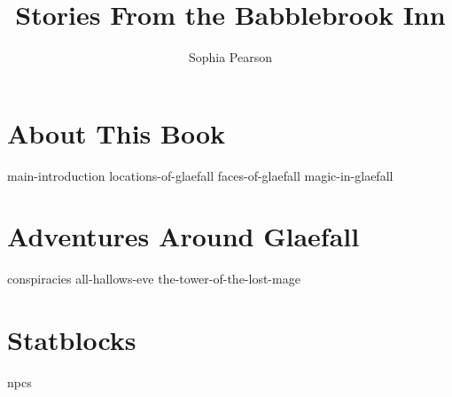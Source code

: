 \documentclass[10pt,twoside,openany,nodeprecatedcode,justified,bg=print]{dndbook}
\title{Stories From the Babblebrook Inn}
\author{Sophia Pearson}
\begin{document}
\frontmatter

\maketitle


\tableofcontents

\mainmatter

\part{About This Book}

{main-introduction}
{locations-of-glaefall}
{faces-of-glaefall}
{magic-in-glaefall}

\part{Adventures Around Glaefall}

{conspiracies}
{all-hallows-eve}
{the-tower-of-the-lost-mage}

\part{Statblocks}

{npcs}
\end{document}
